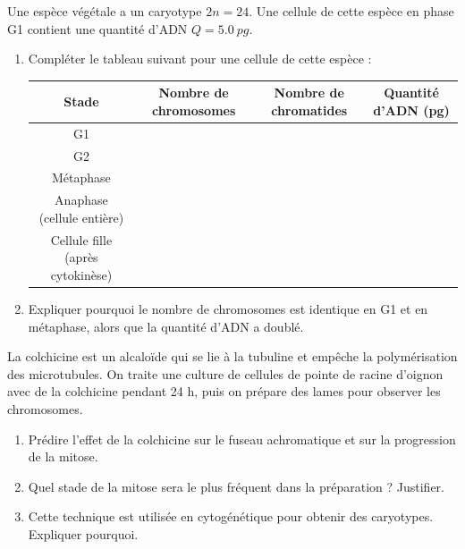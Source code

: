 \documentclass[11pt]{article}
\begin{document}
\begin{exercice}
Une espèce végétale a un caryotype $2n = 24$. Une cellule de cette espèce en phase G1 contient une quantité d'ADN $Q = \SI{5,0}{pg}$.
\begin{enumerate}
\item Compléter le tableau suivant pour une cellule de cette espèce :
\begin{center}
\begin{tabular}{|c|c|c|c|}
\hline
\rowcolor{popblueL} Stade & Nombre de chromosomes & Nombre de chromatides & Quantité d'ADN (pg) \\
\hline
G1 & & & \\
\hline
G2 & & & \\
\hline
Métaphase & & & \\
\hline
Anaphase (cellule entière) & & & \\
\hline
Cellule fille (après cytokinèse) & & & \\
\hline
\end{tabular}
\end{center}
\item Expliquer pourquoi le nombre de chromosomes est identique en G1 et en métaphase, alors que la quantité d'ADN a doublé.
\end{enumerate}
\end{exercice}

\begin{exercice}
La colchicine est un alcaloïde qui se lie à la tubuline et empêche la polymérisation des microtubules. On traite une culture de cellules de pointe de racine d'oignon avec de la colchicine pendant 24 h, puis on prépare des lames pour observer les chromosomes.
\begin{enumerate}
\item Prédire l'effet de la colchicine sur le fuseau achromatique et sur la progression de la mitose.
\item Quel stade de la mitose sera le plus fréquent dans la préparation ? Justifier.
\item Cette technique est utilisée en cytogénétique pour obtenir des caryotypes. Expliquer pourquoi.
\end{enumerate}
\end{exercice}
\end{document}
